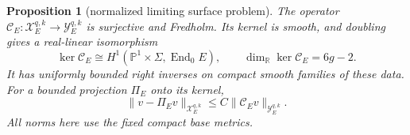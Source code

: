 \documentclass[11pt]{amsart}
\newtheorem{proposition}[theorem]{Proposition}
\theoremstyle{definition}
\theoremstyle{remark}
\theoremstyle{plain}
\newcommand{\RR}{\mathbb{R}}
\newcommand{\PP}{\mathbb{P}}
\newcommand{\End}{\operatorname{End}}
\begin{document}
\begin{proposition}[normalized limiting surface problem]
\label{prop:limiting-surface-inverse}
The operator $\mathcal C_E:\mathcal X_E^{q,k}\to\mathcal Y_E^{q,k}$
is surjective and Fredholm. Its kernel is smooth, and doubling gives
a real-linear isomorphism
\begin{equation}\label{eq:limiting-surface-kernel}
 \ker\mathcal C_E\cong H^1(\PP^1\times\Sigma,\End_0E),
 \qquad \dim_\RR\ker\mathcal C_E=6g-2.
\end{equation}
It has uniformly bounded right inverses on compact smooth families
of these data. For a bounded projection $\Pi_E$ onto its kernel,
\begin{equation}\label{eq:limiting-surface-estimate}
 \|v-\Pi_Ev\|_{\mathcal X_E^{q,k}}
             \leq C\|\mathcal C_Ev\|_{\mathcal Y_E^{q,k}}.
\end{equation}
All norms here use the fixed compact base metrics.
\end{proposition}
\end{document}

